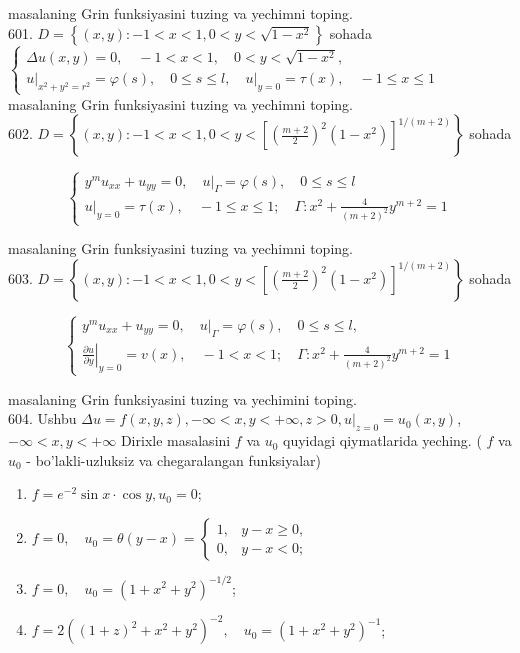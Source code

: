 \documentclass[10pt]{article}
\begin{document}
masalaning Grin funksiyasini tuzing va yechimni toping.\\
601. $D=\left\{(x, y):-1<x<1,0<y<\sqrt{1-x^{2}}\right\}$ sohada\\
$\left\{\begin{array}{l}\Delta u(x, y)=0, \quad-1<x<1, \quad 0<y<\sqrt{1-x^{2}}, \\ \left.u\right|_{x^{2}+y^{2}=r^{2}}=\varphi(s), \quad 0 \leq s \leq l,\left.\quad u\right|_{y=0}=\tau(x), \quad-1 \leq x \leq 1\end{array}\right.$\\
masalaning Grin funksiyasini tuzing va yechimni toping.\\
602. $D=\left\{(x, y):-1<x<1,0<y<\left[\left(\frac{m+2}{2}\right)^{2}\left(1-x^{2}\right)\right]^{1 /(m+2)}\right\}$ sohada

$$
\left\{\begin{array}{l}
y^{m} u_{x x}+u_{y y}=0,\left.\quad u\right|_{\Gamma}=\varphi(s), \quad 0 \leq s \leq l \\
\left.u\right|_{y=0}=\tau(x), \quad-1 \leq x \leq 1 ; \quad \Gamma: x^{2}+\frac{4}{(m+2)^{2}} y^{m+2}=1
\end{array}\right.
$$

masalaning Grin funksiyasini tuzing va yechimni toping.\\
603. $D=\left\{(x, y):-1<x<1,0<y<\left[\left(\frac{m+2}{2}\right)^{2}\left(1-x^{2}\right)\right]^{1 /(m+2)}\right\}$ sohada

$$
\left\{\begin{array}{l}
y^{m} u_{x x}+u_{y y}=0,\left.\quad u\right|_{\Gamma}=\varphi(s), \quad 0 \leq s \leq l, \\
\left.\frac{\partial u}{\partial y}\right|_{y=0}=v(x), \quad-1<x<1 ; \quad \Gamma: x^{2}+\frac{4}{(m+2)^{2}} y^{m+2}=1
\end{array}\right.
$$

masalaning Grin funksiyasini tuzing va yechimini toping.\\
604. Ushbu $\Delta u=f(x, y, z),-\infty<x, y<+\infty, z>0,\left.u\right|_{z=0}=u_{0}(x, y)$,\\
$-\infty<x, y<+\infty$ Dirixle masalasini $f$ va $u_{0}$ quyidagi qiymatlarida yeching. ( $f$ va $u_{0}$ - bo'lakli-uzluksiz va chegaralangan funksiyalar)

\begin{enumerate}
  \item $f=e^{-2} \sin x \cdot \cos y, u_{0}=0$;
  \item $f=0, \quad u_{0}=\theta(y-x)= \begin{cases}1, & y-x \geq 0, \\ 0, & y-x<0 ;\end{cases}$
  \item $f=0, \quad u_{0}=\left(1+x^{2}+y^{2}\right)^{-1 / 2}$;
  \item $f=2\left((1+z)^{2}+x^{2}+y^{2}\right)^{-2}, \quad u_{0}=\left(1+x^{2}+y^{2}\right)^{-1}$;
\end{enumerate}
\end{document}
